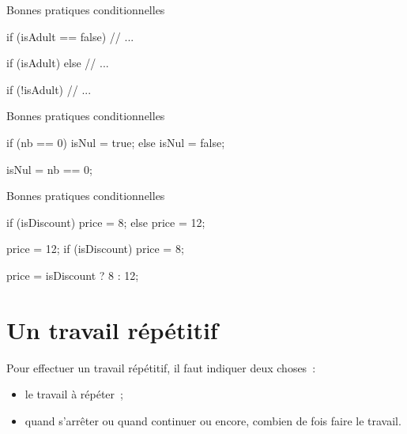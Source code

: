 \begin{hideedit}
\begin{frame}[fragile]{Bonnes pratiques conditionnelles}
  \begin{wrong}
  \begin{java}
if (isAdult == false) {
    // ...
}
  \end{java}
  \end{wrong}
  \pause
  \begin{wrong}
  \begin{java}
if (isAdult) {}
else {
    // ...
}
  \end{java}
  \end{wrong}
  \pause
  \begin{java}
if (!isAdult) {
    // ...
}
  \end{java}
\end{frame}

\begin{frame}[fragile]{Bonnes pratiques conditionnelles}

  \begin{wrong}
  \begin{java}
if (nb == 0){
    isNul = true;
} else {
    isNul = false;
}
  \end{java}
  \end{wrong}
  \pause
  \begin{java}
isNul = nb == 0;
  \end{java}
\end{frame}

\begin{frame}[fragile]{Bonnes pratiques conditionnelles}
  \begin{java}
if (isDiscount) {
    price = 8;
} else {
    price = 12;
}
  \end{java}
  \begin{wrong}
  \begin{java}
price = 12;
if (isDiscount) {
    price = 8;
}
  \end{java}
  \end{wrong}
  \pause
  \begin{java}
price = isDiscount ? 8 : 12;
  \end{java}
\end{frame}

\section{Un travail répétitif}
\frame{\sectionpage}
\begin{frame}
  Pour effectuer un travail répétitif, il faut indiquer deux choses~:
  \begin{itemize}
    \item le travail à répéter~;
    \item quand s’arrêter ou quand continuer ou encore,  combien de fois faire
      le travail.
  \end{itemize}
\end{frame}


\end{hideedit}
